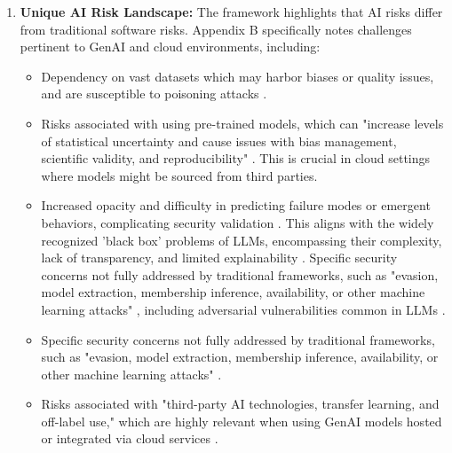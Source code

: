 \begin{enumerate}
    \item \textbf{Unique AI Risk Landscape:} The framework highlights that AI risks differ from traditional software risks. Appendix B specifically notes challenges pertinent to GenAI and cloud environments, including:
    \begin{itemize}
        \item Dependency on vast datasets which may harbor biases or quality issues, and are susceptible to poisoning attacks \cite{tabassi_artificial_2023}.
        \item Risks associated with using pre-trained models, which can "increase levels of statistical uncertainty and cause issues with bias management, scientific validity, and reproducibility" \cite[p.38]{tabassi_artificial_2023}. This is crucial in cloud settings where models might be sourced from third parties.
        \item Increased opacity and difficulty in predicting failure modes or emergent behaviors, complicating security validation \cite{tabassi_artificial_2023}. This aligns with the widely recognized 'black box' problems of LLMs, encompassing their complexity, lack of transparency, and limited explainability \cite{dash_zero-trust_2024}. Specific security concerns not fully addressed by traditional frameworks, such as "evasion, model extraction, membership inference, availability, or other machine learning attacks" \cite[p.39]{tabassi_artificial_2023}, including adversarial vulnerabilities common in LLMs \cite{dash_zero-trust_2024}.
        \item Specific security concerns not fully addressed by traditional frameworks, such as "evasion, model extraction, membership inference, availability, or other machine learning attacks" \cite[p.39]{tabassi_artificial_2023}.
        \item Risks associated with "third-party AI technologies, transfer learning, and off-label use," which are highly relevant when using GenAI models hosted or integrated via cloud services \cite[p.39]{tabassi_artificial_2023}.
    \end{itemize}


\end{enumerate}
